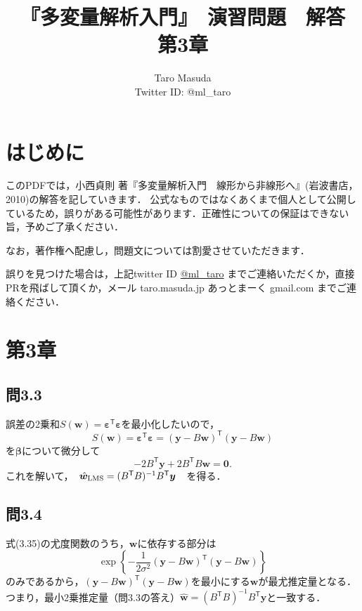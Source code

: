 \documentclass[pdflatex,ja=standard]{bxjsarticle}
\title{『多変量解析入門』　演習問題　解答　第3章}
\author{Taro Masuda \\ Twitter ID: @ml\_taro}
\begin{document}
\maketitle

\section*{はじめに}
このPDFでは，小西貞則 著『多変量解析入門　線形から非線形へ』(岩波書店，2010)の解答を記していきます．
公式なものではなくあくまで個人として公開しているため，誤りがある可能性があります．正確性についての保証はできない旨，予めご了承ください．

なお，著作権へ配慮し，問題文については割愛させていただきます．

誤りを見つけた場合は，上記twitter ID \href{https://twitter.com/ml_taro}{@ml\_taro} までご連絡いただくか，直接PRを飛ばして頂くか，メール taro.masuda.jp あっとまーく gmail.com までご連絡ください．

\section*{第3章}



\subsection*{問3.3}
誤差の2乗和$S(\bm{w}) = \bm{\varepsilon}^{\mathsf{T}} \bm{\varepsilon}$を最小化したいので，
\begin{equation}
S(\bm{w}) = \bm{\varepsilon}^{\mathsf{T}} \bm{\varepsilon} = (\bm{y} - B \bm{w})^{\mathsf{T}} (\bm{y} - B \bm{w})
\end{equation}
を$\bm{\beta}$について微分して
\begin{equation}
- 2 B^{\mathsf{T}} \bm{y} + 2 B^{\mathsf{T}} B \bm{w} = \bm{0}. 
\end{equation}
これを解いて，　$\hat{\bm{w}}_{\rm{LMS}} = (B^{\mathsf{T}} B)^{-1} B^{\mathsf{T}} \bm{y}$　を得る．

\subsection*{問3.4}
式(3.35)の尤度関数のうち，$\bm{w}$に依存する部分は
\begin{equation}
\exp \left\{ -\frac{1}{2\sigma^2} (\bm{y} - B \bm{w})^{\mathsf{T}} (\bm{y} - B \bm{w}) \right\}
\end{equation}
のみであるから，$(\bm{y} - B \bm{w})^{\mathsf{T}} (\bm{y} - B \bm{w})$を最小にする$\bm{w}$が最尤推定量となる．つまり，最小2乗推定量（問3.3の答え）$\hat{\bm{w}} = (B^{\mathsf{T}} B)^{-1} B^{\mathsf{T}} \bm{y}$と一致する．
\end{document}
